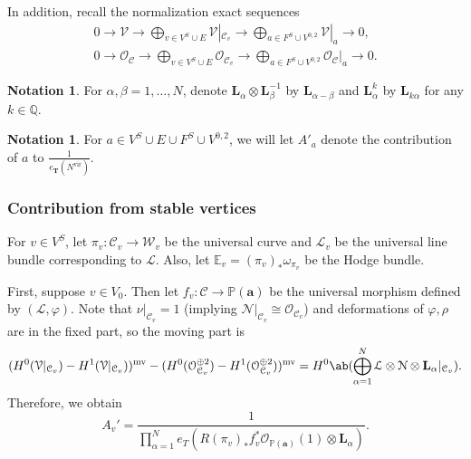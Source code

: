 \documentclass{amsart}
\theoremstyle{definition}
\newtheorem{notn}[thm]{Notation}
\theoremstyle{remark}
\theoremstyle{plain}
\theoremstyle{definition}
\theoremstyle{remark}
\newcommand{\E}{\mathbb{E}}
\newcommand{\Q}{\mathbb{Q}}
\newcommand{\T}{\mathbf{T}}
\renewcommand{\P}{\mathbb{P}}
\newcommand{\ba}{\mathbf{a}}
\newcommand{\mc}[1]{\mathcal{#1}}
\newcommand{\mbf}[1]{\mathbf{#1}}
\newcommand{\mr}[1]{\mathrm{#1}}
\newcommand{\1}{\mathbf{1}}
\newcommand{\2}{\mathbf{2}}
\newcommand{\3}{\mathbf{3}}
\newcommand{\vir}{\mr{vir}}
\newcommand{\mv}{\mr{mv}}
\begin{document}
In addition, recall the normalization exact sequences
\begin{align*}
    0 \to \mc{V} \to \bigoplus_{v \in V^S \cup E} \mc{V}|_{\mc{C}_v} \to \bigoplus_{a \in F^S \cup V^{0,2}} \mc{V}|_a \to 0, \\
    0 \to \mc{O}_{\mc{C}} \to \bigoplus_{v \in V^S \cup E} \mc{O}_{\mc{C}_v} \to \bigoplus_{a \in F^S \cup V^{0,2}} \mc{O}_{\mc{C}}|_a \to 0. 
\end{align*}

\begin{notn}
    For $\alpha, \beta = 1, \ldots, N$, denote $\mbf{L}_{\alpha} \otimes \mbf{L}_{\beta}^{-1}$ by $\mbf{L}_{\alpha-\beta}$ and $\mbf{L}_{\alpha}^{k}$ by $\mbf{L}_{k\alpha}$ for any $k \in \Q$.
\end{notn}

\begin{notn}
    For $a \in V^S \cup E \cup F^S \cup V^{0,2}$, we will let $A'_a$ denote the contribution of $a$ to $\frac{1}{e_{\T}(N^{\vir})}$.
\end{notn}


\subsubsection{Contribution from stable vertices}%
\label{ssub:Contribution from stable vertices}

For $v \in V^S$, let $\pi_v \colon \mc{C}_v \to \mc{W}_v$ be the universal curve and $\mc{L}_v$ be the universal line bundle corresponding to $\mc{L}$. Also, let $\E_v = (\pi_v)_* \omega_{\pi_v}$ be the Hodge bundle.

First, suppose $v \in V_0$. Then let  $f_v \colon \mc{C} \to \P(\ba)$ be the universal morphism defined by $(\mc{L}, \varphi)$. Note that $\nu|_{\mc{C}_v} = 1$ (implying $\mc{N}|_{\mc{C}_v} \cong \mc{O}_{\mc{C}_v}$) and deformations of $\varphi, \rho$ are in the fixed part, so the moving part is
\[ (H^0(\mc{V}|_{\mc{C}_v}) - H^1(\mc{V}|_{\mc{C}_v}))^{\mv} - (H^0(\mc{O}_{\mc{C}_v}^{\oplus 2}) - H^1(\mc{O}_{\mc{C}_v}^{\oplus 2}))^{\mv} = H^0\ab(\bigoplus_{\alpha=1}^N \mc{L} \otimes \mc{N} \otimes \mbf{L}_{\alpha} | _{\mc{C}_v}). \]
Therefore, we obtain
\[ A_v' = \frac{1}{\prod_{\alpha=1}^N e_T(R(\pi_v)_* f_v^* \mc{O}_{\P(\ba)}(1) \otimes \mbf{L}_{\alpha})}. \]
\end{document}
